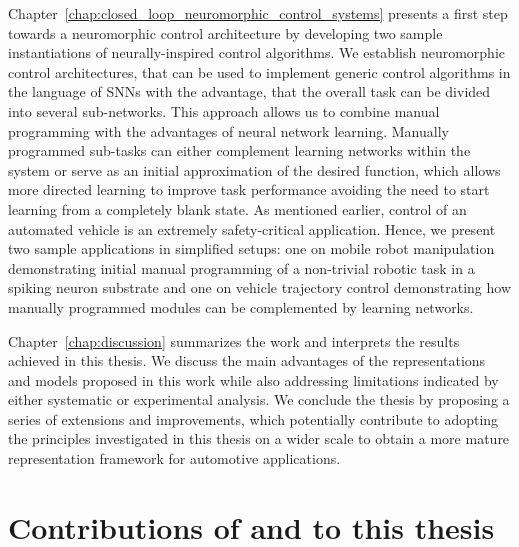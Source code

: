 Chapter~\ref{chap:closed_loop_neuromorphic_control_systems} presents a first step towards a neuromorphic control architecture by developing two sample instantiations of neurally-inspired control algorithms.
We establish neuromorphic control architectures, that can be used to implement generic control algorithms in the language of \acp{SNN} with the advantage, that the overall task can be divided into several sub-networks.
This approach allows us to combine manual programming with the advantages of neural network learning.
Manually programmed sub-tasks can either complement learning networks within the system or serve as an initial approximation of the desired function, which allows more directed learning to improve task performance avoiding the need to start learning from a completely blank state.
As mentioned earlier, control of an automated vehicle is an extremely safety-critical application.
Hence, we present two sample applications in simplified setups: one on mobile robot manipulation demonstrating initial manual programming of a non-trivial robotic task in a spiking neuron substrate and one on vehicle trajectory control demonstrating how manually programmed modules can be complemented by learning networks.

Chapter~\ref{chap:discussion} summarizes the work and interprets the results achieved in this thesis.
We discuss the main advantages of the representations and models proposed in this work while also addressing limitations indicated by either systematic or experimental analysis.
We conclude the thesis by proposing a series of extensions and improvements, which potentially contribute to adopting the principles investigated in this thesis on a wider scale to obtain a more mature representation framework for automotive applications.

\section{Contributions of and to this thesis}%
\label{sec:contributions_of_and_to_this_thesis}


